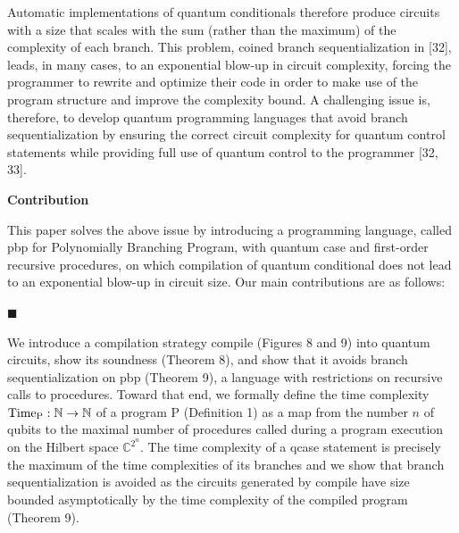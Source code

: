  
Automatic implementations of quantum conditionals therefore produce circuits with a size that scales with the sum (rather than the maximum) of the complexity of each branch. This problem, coined branch sequentialization in [32], leads, in many cases, to an exponential blow-up in circuit complexity, forcing the programmer to rewrite and optimize their code in order to make use of the program structure and improve the complexity bound. A challenging issue is, therefore, to develop quantum programming languages that avoid branch sequentialization by ensuring the correct circuit complexity for quantum control statements while providing full use of quantum control to the programmer [32, 33].\par
 
 
 
 
\par\medskip\noindent\textbf{Contribution}\par
 
 
This paper solves the above issue by introducing a programming language, called pbp for Polynomially Branching Program, with quantum case and first-order recursive procedures, on which compilation of quantum conditional does not lead to an exponential blow-up in circuit size. Our main contributions are as follows:\par
  
\par\noindent  $\blacksquare$ 
 
We introduce a compilation strategy compile (Figures 8 and 9) into quantum circuits, show its soundness (Theorem 8), and show that it avoids branch sequentialization on pbp (Theorem 9), a language with restrictions on recursive calls to procedures. Toward that end, we formally define the time complexity $\textnormal{Time}_{\mathrm{P}}:\mathbb{N}\to\mathbb{N}$ of a program $\mathrm{P}$ (Definition 1) as a map from the number $n$ of qubits to the maximal number of procedures called during a program execution on the Hilbert space $\mathbb{C}^{2^{n}}$. The time complexity of a qcase statement is precisely the maximum of the time complexities of its branches and we show that branch sequentialization is avoided as the circuits generated by compile have size bounded asymptotically by the time complexity of the compiled program (Theorem 9).\par
 
